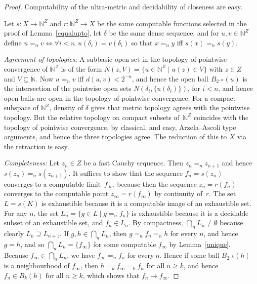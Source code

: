 \documentclass[10pt]{article}
\newcommand{\N}{\mathbb{N}}
\begin{document}
\begin{proof}
  Computability of the ultra-metric and decidability of closeness are
  easy.

  Let $s \colon X \to \N^Z$ and $r \colon \N^Z \to X$ be the same
  computable functions selected in the proof of Lemma~\ref{equalupto},
  let $\delta$ be the same dense sequence, and for $u,v \in \N^Z$
  define $u =_n v \iff \forall i<n.\,u(\delta_i)=v(\delta_i)$ so that
  $x =_n y$ iff $s(x) =_n s(y)$.

  \medskip
  \noindent
  \emph{Agreement of topologies:} A subbasic open set in the topology
  of pointwise convergence of $\N^Z$ is of the form $ N(z,V)=\{u \in
  \N^Z \mid u(z) \in V\}$ with $z \in Z$ and $V \subseteq \N$. Now $u
  =_n v$ iff $d(u,v) < 2^{-n}$, and hence the open ball
  $B_{2^{-n}}(u)$ is the intersection of the pointwise open sets
  $N(\delta_i,\{u(\delta_i)\})$, for $i<n$, and hence open balls are
  open in the topology of pointwise convergence.  For a compact
  subspace of $\N^Z$, density of $\delta$ gives that metric topology
  agrees with the pointwise topology. But the relative topology on
  compact subsets of~$\N^Z$ coincides with the topology of pointwise
  convergence, by classical, and easy, Arzela--Ascoli type arguments,
  and hence the three topologies agree. The reduction of this to $X$
  via the retraction is easy.

\pagebreak[3]
  \medskip
  \noindent
  \emph{Completeness:}
%
  Let $z_n \in Z$ be a fast Cauchy sequence. Then $z_n =_n z_{n+1}$ and
  hence $s(z_n) =_n s(z_{n+1})$. It suffices to show that the sequence
  $f_n=s(z_n)$ converges to a computable limit~$f_\infty$, because
  then the sequence $z_n = r(f_n)$ converges to the computable point
  $z_\infty = r(f_\infty)$ by continuity of~$r$. The set $L=s(K)$ is
  exhaustible because it is a computable image of an exhaustible set.
  For any $n$, the set $L_n = \{ g \in L \mid g =_n f_n \}$ is
  exhaustible because it is a decidable subset of an exhaustible set,
  and $f_n \in L_n$.  By compactness, $\bigcap_n L_n \ne \emptyset$
  because clearly $L_n \supseteq L_{n+1}$. If $g,h \in \bigcap_n L_n$,
  then $g =_n f_n =_n h$ for every $n$, and hence $g=h$, and so
  $\bigcap_n L_n = \{f_\infty\}$ for some computable $f_\infty$ by
  Lemma~\ref{unique}.  Because $f_\infty \in \bigcap_n L_n$, we have
  $f_\infty =_n f_n$ for every$~n$.  Hence if some ball $B_{2^{-k}}(h)$
  is a neighbourhood of $f_\infty$, then $h =_k
  f_\infty =_k f_n$ for all $n \ge k$, and hence $f_n \in B_k(h)$ for
  all $n \ge k$, which shows that $f_n \to f_\infty$.
\end{proof}
\end{document}

